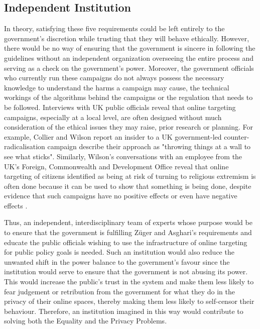\documentclass[preprint]{acmart}
\begin{document}
\subsection{Independent Institution}

In theory, satisfying these five requirements could be left entirely to the government's discretion while trusting that they will behave ethically. However, there would be no way of ensuring that the government is sincere in following the guidelines without an independent organization overseeing the entire process and serving as a check on the government's power. Moreover, the government officials who currently run these campaigns do not always possess the necessary knowledge to understand the harms a campaign may cause, the technical workings of the algorithms behind the campaigns or the regulation that needs to be followed. Interviews with UK public officials reveal that online targeting campaigns, especially at a local level, are often designed without much consideration of the ethical issues they may raise, prior research or planning. For example, Collier and Wilson \cite{collierwilson} report an insider to a UK government-led counter-radicalisation campaign describe their approach as "throwing things at a wall to see what sticks". Similarly, Wilson's conversations with an employee from the UK's Foreign, Commonwealth and Development Office reveal that online targeting of citizens identified as being at risk of turning to religious extremism is often done because it can be used to show that something is being done, despite evidence that such campaigns have no positive effects or even have negative effects \cite{wilson}.

Thus, an independent, interdisciplinary team of experts whose purpose would be to ensure that the government is fulfilling Züger and Asghari's requirements and educate the public officials wishing to use the infrastructure of online targeting for public policy goals is needed. Such an institution would also reduce the unwanted shift in the power balance to the government's favour since the institution would serve to ensure that the government is not abusing its power. This would increase the public's trust in the system and make them less likely to fear judgement or retribution from the government for what they do in the privacy of their online spaces, thereby making them less likely to self-censor their behaviour. Therefore, an institution imagined in this way would contribute to solving both the Equality and the Privacy Problems. 
\end{document}
